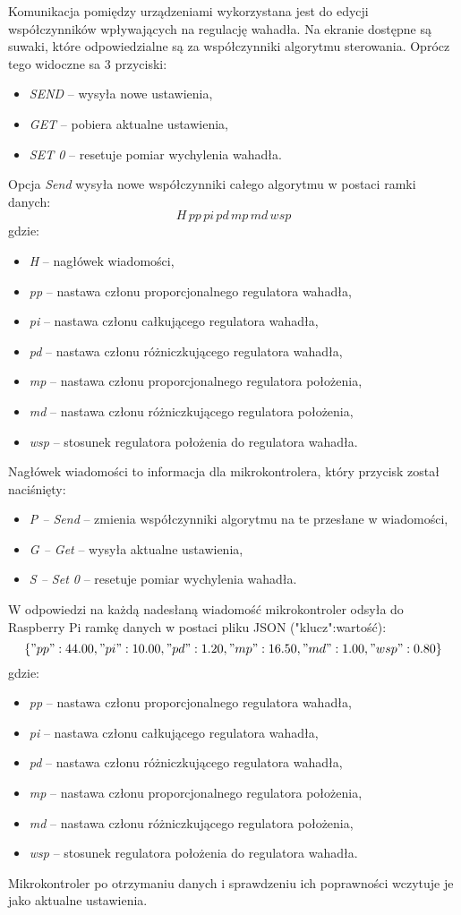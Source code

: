 Komunikacja pomiędzy urządzeniami wykorzystana jest do edycji współczynników wpływających na regulację wahadła. Na ekranie dostępne są suwaki, które odpowiedzialne są za współczynniki algorytmu sterowania. Oprócz tego widoczne sa 3 przyciski:
\begin{itemize}
    \item \textit{SEND} -- wysyła nowe ustawienia,
    \item \textit{GET} -- pobiera aktualne ustawienia,
    \item \textit{SET 0} -- resetuje pomiar wychylenia wahadła.
\end{itemize}
Opcja \textit{Send} wysyła nowe współczynniki całego algorytmu w postaci ramki danych: \[H\,pp\,pi\,pd\,mp\,md\,wsp\]
gdzie:
\begin{itemize}
    \item \textit{H} -- nagłówek wiadomości,
    \item \textit{pp} -- nastawa członu proporcjonalnego regulatora wahadła, 
    \item \textit{pi} -- nastawa członu całkującego regulatora wahadła,
    \item \textit{pd} -- nastawa członu różniczkującego regulatora wahadła,
    \item \textit{mp} -- nastawa członu proporcjonalnego regulatora położenia,
    \item \textit{md} -- nastawa członu różniczkującego regulatora położenia,
    \item \textit{wsp} -- stosunek regulatora położenia do regulatora wahadła.
    \label{it:ramka}
\end{itemize}
Nagłówek wiadomości to informacja dla mikrokontrolera, który przycisk został naciśnięty:
\begin{itemize}
    \item \textit{P -- Send} -- zmienia współczynniki algorytmu na te przesłane w wiadomości,
    \item \textit{G -- Get} --  wysyła aktualne ustawienia,
    \item \textit{S -- Set 0} -- resetuje pomiar wychylenia wahadła.
\end{itemize}
W odpowiedzi na każdą nadesłaną wiadomość mikrokontroler odsyła do Raspberry Pi ramkę danych w postaci pliku JSON ("klucz":wartość):
\[\{"pp":44.00,"pi":10.00,"pd":1.20,"mp":16.50,"md":1.00,"wsp":0.80\}\] 
gdzie:
\begin{itemize}
    \item \textit{pp} -- nastawa członu proporcjonalnego regulatora wahadła, 
    \item \textit{pi} -- nastawa członu całkującego regulatora wahadła,
    \item \textit{pd} -- nastawa członu różniczkującego regulatora wahadła,
    \item \textit{mp} -- nastawa członu proporcjonalnego regulatora położenia,
    \item \textit{md} -- nastawa członu różniczkującego regulatora położenia,
    \item \textit{wsp} -- stosunek regulatora położenia do regulatora wahadła.
    \label{it:ramka}
\end{itemize}

Mikrokontroler po otrzymaniu danych i sprawdzeniu ich poprawności wczytuje je jako aktualne ustawienia. 

